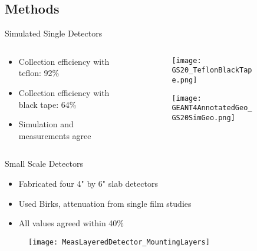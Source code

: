 \subsection{Methods}
\begin{frame}{Simulated Single Detectors}
  \begin{columns}[onlytextwidth]
    \begin{column}{0.55\textwidth}
      \begin{itemize}
        \item Collection efficiency with teflon: 92\%
        \item Collection efficiency with black tape: 64\%
        \item Simulation and measurements agree
      \end{itemize}
    \end{column}
    \begin{column}{0.4\textwidth}
      \begin{figure}
        \vspace*{-1cm}
        \begin{subfigure}[b]{\textwidth}
        \texttt{[image: GS20\_TeflonBlackTape.png]}
        \end{subfigure}
        
        \begin{subfigure}[b]{\textwidth}
        \texttt{[image: GEANT4AnnotatedGeo\_GS20SimGeo.png]}
        \end{subfigure}
      \end{figure}
    \end{column}
  \end{columns}
\hyperlink{G4Intro}{}
\end{frame}
\begin{frame}{Small Scale Detectors}
\begin{itemize}
  \item Fabricated four 4" by 6" slab detectors
  \item Used Birks, attenuation from single film studies
  \item All values agreed within 40\%
\end{itemize}
\begin{figure}
	\centering
	\texttt{[image: MeasLayeredDetector\_MountingLayers]}
\end{figure}
\hyperlink{G4Intro}{}
\end{frame}
